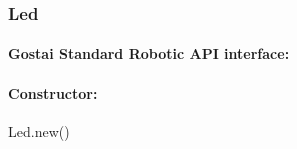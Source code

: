 







\subsubsection{Led}

\paragraph{Gostai Standard Robotic API interface:} 

\paragraph{Constructor:} Led.new()

